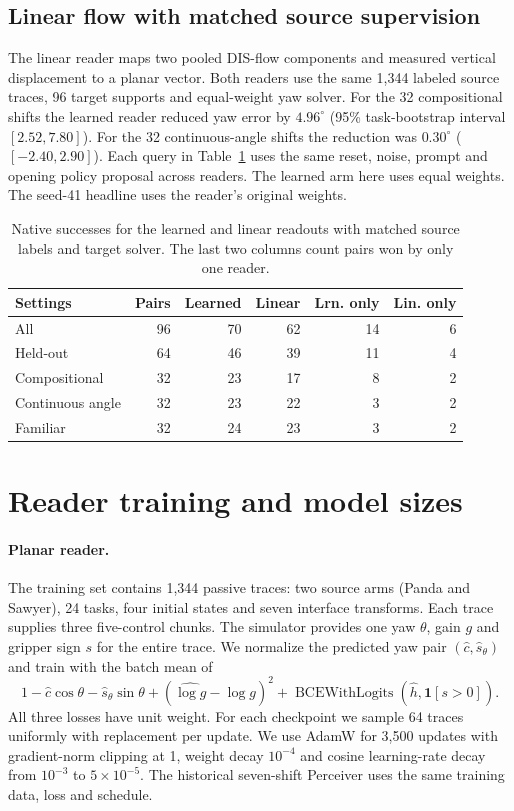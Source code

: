\documentclass{article}
\theoremstyle{plain}
\theoremstyle{remark}
\begin{document}
\subsection{Linear flow with matched source supervision}
\label{sec:matchedflow}
The linear reader maps two pooled DIS-flow components and measured vertical displacement to a planar vector. Both readers use the same 1,344 labeled source traces, 96 target supports and equal-weight yaw solver. For the 32 compositional shifts the learned reader reduced yaw error by $4.96^\circ$ (95\% task-bootstrap interval $[2.52,7.80]$). For the 32 continuous-angle shifts the reduction was $0.30^\circ$ ($[-2.40,2.90]$). Each query in Table~\ref{tab:matchedflow} uses the same reset, noise, prompt and opening policy proposal across readers. The learned arm here uses equal weights. The seed-41 headline uses the reader's original weights.

\begin{table}[h]
\centering\small
\caption{Native successes for the learned and linear readouts with matched source labels and target solver. The last two columns count pairs won by only one reader.}
\label{tab:matchedflow}
\setlength{\tabcolsep}{3pt}
\begin{tabular}{lrrrrr}
\toprule
Settings & Pairs & Learned & Linear & Lrn. only & Lin. only \\
\midrule
All & 96 & 70 & 62 & 14 & 6 \\
Held-out & 64 & 46 & 39 & 11 & 4 \\
Compositional & 32 & 23 & 17 & 8 & 2 \\
Continuous angle & 32 & 23 & 22 & 3 & 2 \\
Familiar & 32 & 24 & 23 & 3 & 2 \\
\bottomrule
\end{tabular}
\end{table}

\section{Reader training and model sizes}
\label{sec:training-details}
\paragraph{Planar reader.} The training set contains 1,344 passive traces: two source arms (Panda and Sawyer), 24 tasks, four initial states and seven interface transforms. Each trace supplies three five-control chunks. The simulator provides one yaw $\theta$, gain $g$ and gripper sign $s$ for the entire trace. We normalize the predicted yaw pair $(\hat c,\hat s_\theta)$ and train with the batch mean of
\[
  1-\hat c\cos\theta-\hat s_\theta\sin\theta
  +(\widehat{\log g}-\log g)^2
  +\operatorname{BCEWithLogits}(\hat h,\mathbf{1}[s>0]).
\]
All three losses have unit weight. For each checkpoint we sample 64 traces uniformly with replacement per update. We use AdamW for 3,500 updates with gradient-norm clipping at 1, weight decay $10^{-4}$ and cosine learning-rate decay from $10^{-3}$ to $5\times10^{-5}$. The historical seven-shift Perceiver uses the same training data, loss and schedule.
\end{document}

